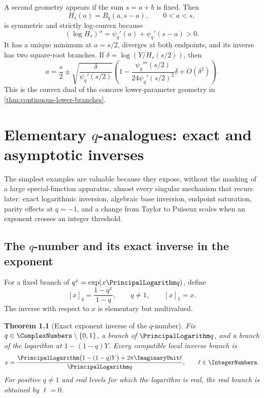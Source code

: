 \documentclass[11pt,a4paper,oneside,openany]{book}
\newtheorem{theorem}{Theorem}[chapter]
\theoremstyle{definition}
\theoremstyle{remark}
\begin{document}
A second geometry appears if the sum \(s=a+b\) is fixed.  Then
\[
 H_s(a)=B_q(a,s-a),\qquad0<a<s,
\]
is symmetric and strictly log-convex because
\[
 (\log H_s)''=\psi_q'(a)+\psi_q'(s-a)>0.
\]
It has a unique minimum at \(a=s/2\), diverges at both endpoints, and its
inverse has two square-root branches.  If
\(\delta=\log(Y/H_s(s/2))\), then
\begin{equation}\label{eq:qbeta-fixed-sum-inverse}
 a=\frac s2\pm\sqrt{\frac{\delta}{\psi_q'(s/2)}}
 \left(1-\frac{\psi_q'''(s/2)}{24\psi_q'(s/2)^2}\delta+O(\delta^2)\right).
\end{equation}
This is the convex dual of the concave lower-parameter geometry in
\cref{thm:continuous-lower-branches}.

\chapter{Elementary \texorpdfstring{$q$}{q}-analogues: exact and asymptotic inverses}

The simplest examples are valuable because they expose, without the masking
of a large special-function apparatus, almost every singular mechanism that
recurs later: exact logarithmic inversion, algebraic base inversion, endpoint
saturation, parity effects at \(q=-1\), and a change from Taylor to Puiseux
scales when an exponent crosses an integer threshold.

\section{The \texorpdfstring{$q$}{q}-number and its exact inverse in the exponent}

For a fixed branch of \(q^x=\exp(x\PrincipalLogarithm q)\), define
\begin{equation}\label{eq:q-number-definition}
 [x]_q=\frac{1-q^x}{1-q},\qquad q\ne1,
 \qquad [x]_1=x.
\end{equation}
The inverse with respect to \(x\) is elementary but multivalued.

\begin{theorem}[Exact exponent inverse of the \(q\)-number]\label{thm:q-number-x-inverse}
Fix \(q\in\ComplexNumbers\setminus\{0,1\}\), a branch of \(\PrincipalLogarithm q\), and a branch of the
logarithm at \(1-(1-q)Y\).  Every compatible local inverse branch is
\begin{equation}\label{eq:q-number-exact-x-inverse}
 x=\frac{\PrincipalLogarithm\bigl(1-(1-q)Y\bigr)+2\pi \ImaginaryUnit \ell}{\PrincipalLogarithm q},
 \qquad \ell\in\IntegerNumbers.
\end{equation}
For positive \(q\ne1\) and real levels for which the logarithm is real, the
real branch is obtained by \(\ell=0\).
\end{theorem}
\end{document}
